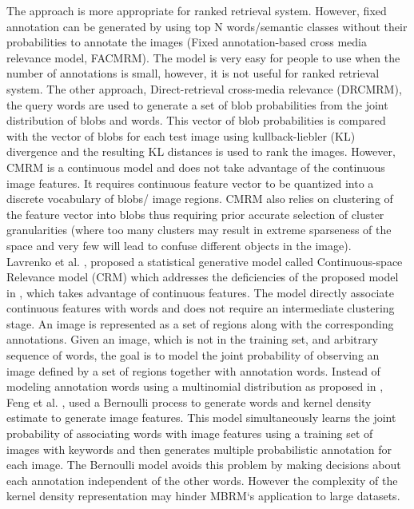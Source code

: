 \documentclass[conference]{IEEEtran}
\begin{document}
		The approach is more appropriate for ranked
retrieval system. However, fixed annotation can be generated by using top N words/semantic
classes without their probabilities to annotate the images (Fixed annotation-based cross media relevance model, FACMRM). The model is very easy for people to use when the
number of annotations is small, however, it is not useful for ranked retrieval system. The
other approach, Direct-retrieval cross-media relevance (DRCMRM), the query words are
used to generate a set of blob probabilities from the joint distribution of blobs and words.
This vector of blob probabilities is compared with the vector of blobs for each test image
using kullback-liebler (KL) divergence and the resulting KL distances is used to rank
the images. However, CMRM is a continuous model and does not take advantage of the
continuous image features. It requires continuous feature vector to be quantized into a
discrete vocabulary of blobs/ image regions. CMRM also relies on clustering of the feature
vector into blobs thus requiring prior accurate selection of cluster granularities (where too
many clusters may result in extreme sparseness of the space and very few will lead to confuse
different objects in the image).\\
		
		Lavrenko et al. \cite{b4}, proposed a statistical generative model called Continuous-space
Relevance model (CRM) which addresses the deficiencies of the proposed model in \cite{b3},
which takes advantage of continuous features. The model directly associate continuous
features with words and does not require an intermediate clustering stage. An image is
represented as a set of regions along with the corresponding annotations. Given an image,
which is not in the training set, and arbitrary sequence of words, the goal is to model the
joint probability of observing an image defined by a set of regions together with annotation
words. Instead of modeling annotation words using a multinomial distribution as proposed in \cite{b4}, Feng et al. \cite{b5}, used a Bernoulli process to generate words and kernel
density estimate to generate image features. This model simultaneously learns the joint
probability of associating words with image features using a training set of images with
keywords and then generates multiple probabilistic annotation for each image. The Bernoulli
model avoids this problem by making decisions about each annotation independent of
the other words. However the complexity of the kernel density representation may hinder
MBRM‘s application to large datasets.
		
\end{document}
